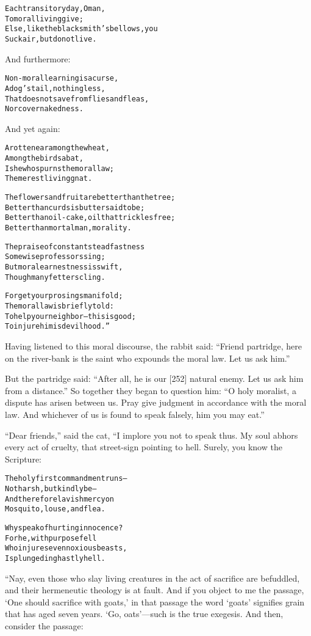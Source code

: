 \documentclass{article}
\renewenvironment{verbatim}{\begin{alltt}\normalfont\begin{centering}}{\end{centering}\end{alltt}}
\begin{document}
\begin{verbatim}
Each transitory day, O man,
    To moral living give;
Else, like the blacksmith's bellows, you
    Suck air, but do not live.
\end{verbatim}
And furthermore:

\begin{verbatim}
Non-moral learning is a curse,
    A dog's tail, nothing less,
That does not save from flies and fleas,
    Nor cover nakedness.
\end{verbatim}
And yet again:

\begin{verbatim}
A rotten ear among the wheat,
    Among the birds a bat,
Is he who spurns the moral law;
    The merest living gnat.

The flowers and fruit are better than the tree;
Better than curds is butter said to be;
Better than oil-cake, oil that trickles free;
Better than mortal man, morality.

The praise of constant steadfastness
    Some wise professors sing;
But moral earnestness is swift,
    Though many fetters cling.

Forget your prosings manifold;
The moral law is briefly told:
To help your neighbor--this is good;
To injure him is devilhood.”
\end{verbatim}
Having listened to this moral discourse, the rabbit said:
``Friend partridge, here on the river-bank is the saint who expounds the moral law. Let us ask him.''

But the partridge said:
``After all, he is our [252] natural enemy. Let us ask him from a distance.''
So together they began to question him:
``O holy moralist, a dispute has arisen between us. Pray give judgment in accordance with the moral law. And whichever of us is found to speak falsely, him you may eat.''

``Dear friends,'' said the cat, “I implore you not to speak thus.
My soul abhors every act of cruelty, that street-sign pointing to
hell. Surely, you know the Scripture:

\begin{verbatim}
The holy first commandment runs--
    Not harsh, but kindly be--
And therefore lavish mercy on
    Mosquito, louse, and flea.

Why speak of hurting innocence?
    For he, with purpose fell
Who injures even noxious beasts,
    Is plunged in ghastly hell.
\end{verbatim}
“Nay, even those who slay living creatures in the act of sacrifice
are befuddled, and their hermeneutic theology is at fault. And if
you object to me the passage, `One should sacrifice with goats,' in
that passage the word `goats' signifies grain that has aged seven
years. `Go, oats'---such is the true exegesis. And then, consider
the passage:
\end{document}
